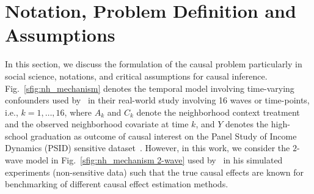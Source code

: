 \documentclass[letterpaper]{article} %
\begin{document}
\section{Notation, Problem Definition and Assumptions}\label{sec:problemdefinition,assumptions,notations}
In this section, we discuss the formulation of the causal problem particularly in social science, notations, and critical assumptions for causal inference.
Fig.~\ref{sfig:nh_mechanism} denotes the temporal model involving time-varying confounders used by~\citet{wodtke2011ipw} in their real-world study involving 16 waves or time-points, i.e., $k{ = }1, \ldots, 16$, where $A_k$ and $C_k$ denote the neighborhood context treatment and the observed neighborhood covariate at time $k$, and $Y$ denotes the high-school graduation as outcome of causal interest on the Panel Study of Income Dynamics (PSID) sensitive dataset~\cite{geolytics2003censuscdPSID}.
However, in this work, we consider the $2$-wave model in Fig.~\ref{sfig:nh_mechanism 2-wave} used by~\citet{wodtke2020rwr} in his simulated experiments (non-sensitive data) such that the true causal effects are known for benchmarking of different causal effect estimation methods.
\end{document}
